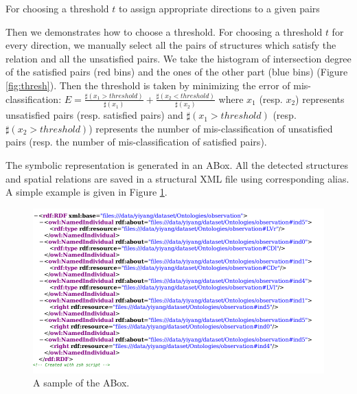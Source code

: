 \documentclass{article}
\begin{document}
For choosing a threshold $t$ to assign appropriate directions to a given pairs


Then we demonstrates how to choose a threshold.
For choosing a threshold $t$ for every direction, we manually select all the pairs of structures which satisfy the relation and all the unsatisfied pairs.
We take the histogram of intersection degree of the satisfied pairs (red bins) and the ones of the other part (blue bins) (Figure \ref{fig:thresh}).
Then the threshold is taken by minimizing the error of mis-classification:
$E=\frac{\sharp(x_1>threshold)}{\sharp(x_1)}+\frac{\sharp(x_2<threshold)}{\sharp(x_2)}$ where $x_1$ (resp. $x_2$) represents unsatisfied pairs (resp. satisfied pairs) 
and $\sharp(x_1>threshold)$ (resp. $\sharp(x_2>threshold)$) represents the number of mis-classification of unsatisfied pairs (resp. the number of mis-classification of satisfied pairs).

The symbolic representation is generated in an ABox. All the detected structures and spatial relations are saved in a structural XML file using corresponding alias.
A simple example is given in Figure \ref{fig:owlfile}.
\begin{figure}[h]
 \centering
 \includegraphics[width=.5\textwidth]{./figures/xml_screenshot.png}
 \caption{\label{fig:owlfile}A sample of the ABox.}
\end{figure}


 
\end{document}
